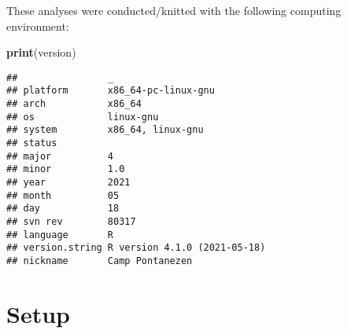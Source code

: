 \documentclass[]{book}
\newenvironment{Shaded}{\begin{snugshade}}{\end{snugshade}}
\newcommand{\KeywordTok}[1]{\textcolor[rgb]{0.13,0.29,0.53}{\textbf{#1}}}
\newcommand{\NormalTok}[1]{#1}
\begin{document}
These analyses were conducted/knitted with the following computing environment:

\begin{Shaded}
\begin{Highlighting}[]
\KeywordTok{print}\NormalTok{(version)}
\end{Highlighting}
\end{Shaded}

\begin{verbatim}
##                _                           
## platform       x86_64-pc-linux-gnu         
## arch           x86_64                      
## os             linux-gnu                   
## system         x86_64, linux-gnu           
## status                                     
## major          4                           
## minor          1.0                         
## year           2021                        
## month          05                          
## day            18                          
## svn rev        80317                       
## language       R                           
## version.string R version 4.1.0 (2021-05-18)
## nickname       Camp Pontanezen
\end{verbatim}

\hypertarget{setup-1}{%
\section{Setup}\label{setup-1}}
\end{document}
